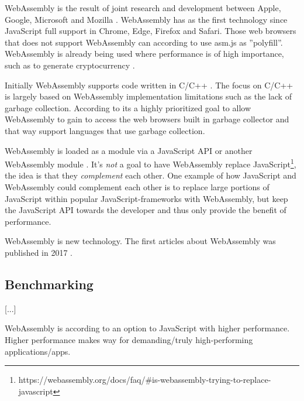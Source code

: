 WebAssembly is the result of joint research and development between Apple, Google, Microsoft and Mozilla \parencite{HaasRossbergSchuffTitzerHolmanGohmanWagnerZakaiBastien2017}. WebAssembly has as the first technology since JavaScript full support in Chrome, Edge, Firefox and Safari. Those web browsers that does not support WebAssembly can according to \textcite{HaasRossbergSchuffTitzerHolmanGohmanWagnerZakaiBastien2017} use asm.js as ''polyfill''. WebAssembly is already being used where performance is of high importance, such as to generate cryptocurrency \parencite{RuthZimmermannWolsingHohlfeld2018}.

Initially WebAssembly supports code written in C/C++ \parencite{HaasRossbergSchuffTitzerHolmanGohmanWagnerZakaiBastien2017}. 
The focus on C/C++ is largely based on WebAssembly implementation limitations such as the lack of garbage collection. According to \textcite{HaasRossbergSchuffTitzerHolmanGohmanWagnerZakaiBastien2017} its a highly prioritized goal to allow WebAssembly to gain to access the web browsers built in garbage collector and that way support languages that use garbage collection.

WebAssembly is loaded as a module via a JavaScript API or another WebAssembly module \parencite{HaasRossbergSchuffTitzerHolmanGohmanWagnerZakaiBastien2017}. It's \emph{not} a goal to have WebAssembly replace JavaScript\footnote{https://webassembly.org/docs/faq/\#is-webassembly-trying-to-replace-javascript}, the idea is that they \emph{complement} each other. One example of how JavaScript and WebAssembly could complement each other is to replace large portions of JavaScript within popular JavaScript-frameworks with WebAssembly, but keep the JavaScript API towards the developer and thus only provide the benefit of performance.

WebAssembly is new technology. The first articles about WebAssembly was published in 2017 \parencite{HaasRossbergSchuffTitzerHolmanGohmanWagnerZakaiBastien2017,ReiserBlaser2017}.

\subsection{Benchmarking}

\parencite{LehmannPradel2018,MalleGiulianiKiesebergHolzinger2018}

[...]

WebAssembly is according to \textcite{HaasRossbergSchuffTitzerHolmanGohmanWagnerZakaiBastien2017} an option to JavaScript with higher performance. Higher performance makes way for demanding/truly high-performing applications/apps.
